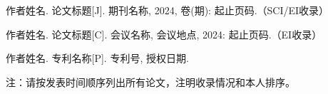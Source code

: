 
\makepublications

\begin{enumerate}[label={[}\arabic*{]}]
\item 作者姓名. 论文标题[J]. 期刊名称, 2024, 卷(期): 起止页码.（SCI/EI收录）

\item 作者姓名. 论文标题[C]. 会议名称, 会议地点, 2024: 起止页码.（EI收录）

\item 作者姓名. 专利名称[P]. 专利号, 授权日期.
\end{enumerate}

注：请按发表时间顺序列出所有论文，注明收录情况和本人排序。
